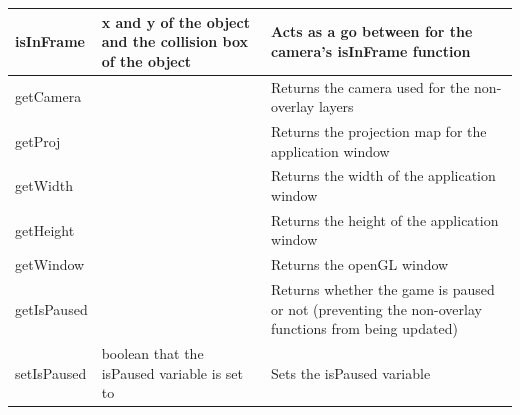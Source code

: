 \documentclass{article}
\begin{document}
\begin{center}
\begin{tabular}{ | m{} | m{}| m{} | }
                        \hline
                        isInFrame & x and y of the object and the collision box of the object & Acts as a go between for the camera's isInFrame function \\
                        \hline
                        getCamera & & Returns the camera used for the non-overlay layers \\
                        \hline
                        getProj & & Returns the projection map for the application window \\
                        \hline
                        getWidth & & Returns the width of the application window \\
                        \hline
                        getHeight & & Returns the height of the application window \\
                        \hline
                        getWindow & & Returns the openGL window \\
                        \hline
                        getIsPaused & & Returns whether the game is paused or not (preventing the non-overlay functions from being updated) \\
                        \hline
                        setIsPaused & boolean that the isPaused variable is set to & Sets the isPaused variable \\
                        \hline
                    \end{tabular}
                \end{center}
            \clearpage
\end{document}
